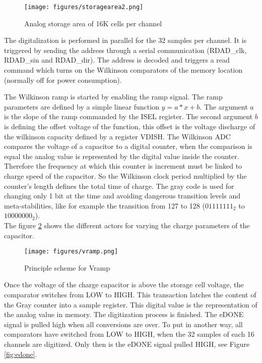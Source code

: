 \begin{figure}[H]
\centering
\texttt{[image: figures/storagearea2.png]}\\
\caption{\label{fig:storagearea} Analog storage area of 16K cells per channel}
\end{figure}

\noindent
The digitalization is performed in parallel for the 32 samples per channel. It is triggered by sending the address through a serial communication (RDAD\_clk, RDAD\_sin and RDAD\_dir). The address is decoded and triggers a read command which turns on the Wilkinson comparators of the memory location (normally off for power consumption).

\noindent
The Wilkinson ramp is started by enabling the ramp signal. The ramp parameters are defined by a simple linear function $y = a*x+b$. The argument $a$ is the slope of the ramp commanded by the ISEL register. The second argument $b$ is defining the offset voltage of the function, this offset is the voltage discharge of the wilkinson capacity defined by a register VDISH. The Wilkinson ADC compares the voltage of a capacitor to a digital counter, when the comparison is equal the analog value is represented by the digital value inside the counter. Therefore the frequency at which this counter is increment must be linked to charge speed of the capacitor. So the Wilkinson clock period multiplied by the counter's length defines the total time of charge. The gray code is used for changing only 1 bit at the time and avoiding dangerous transition levels and meta-stabilities, like for example the transition from 127 to 128 ($01111111_{2}$ to $10000000_{2}$).\\The figure \ref{fig:vramp} shows the different actors for varying the charge parameters of the capacitor.

\begin{figure}[H]
\centering
\texttt{[image: figures/vramp.png]}\\
\caption{\label{fig:vramp} Principle scheme for Vramp}
\end{figure}

\noindent
Once the voltage of the charge capacitor is above the storage cell voltage, the comparator switches from LOW to HIGH. This transaction latches the content of the Gray counter into a sample register. This digital value is the representation of the analog value in memory. The digitization process is finished. The eDONE signal is pulled high when all conversions are over. To put in another way, all comparators have switched from LOW to HIGH, when the 32 samples of each 16 channels are digitized. Only then is the eDONE signal pulled HIGH, see Figure \ref{fig:edone}. \\

